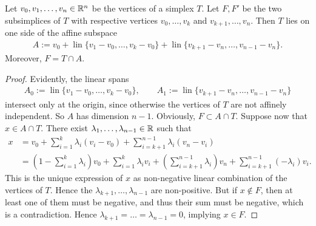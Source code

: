 \documentclass[10pt,a4paper]{article}
\begin{document}
\begin{lemma}\label{lemma:oppositesubsimplex}
    Let $v_0, v_1, \dots, v_n \in {\mathbb R}^n$ be the vertices of a simplex $T$.
    Let $F, F'$ be the two subsimplices of $T$ with respective vertices $v_0,\dots,v_k$ and $v_{k+1},\dots,v_n$.
    Then $T$ lies on one side of the affine subspace
    \begin{gather*}
        A 
        := 
        v_0 
        + 
        \operatorname{lin}\{ v_1 - v_0, \dots, v_k - v_0 \} 
        +  
        \operatorname{lin}\{ v_{k+1} - v_n, \dots, v_{n-1} - v_n \}.
    \end{gather*}
    Moreover, $F = T \cap A$.
\end{lemma}
\begin{proof}
    Evidently, the linear spans 
    \begin{gather*}
        A_{0} := \operatorname{lin}\{ v_1 - v_0, \dots, v_k - v_0 \},
        \qquad 
        A_{1} := \operatorname{lin}\{ v_{k+1} - v_n, \dots, v_{n-1} - v_n \}
    \end{gather*}
    intersect only at the origin, since otherwise the vertices of $T$ are not affinely independent. 
    So $A$ has dimension $n-1$. 
    Obviously, $F \subset A \cap T$. 
    Suppose now that $x \in A \cap T$.
    There exist $\lambda_1,\dots,\lambda_{n-1} \in {\mathbb R}$ such that 
    \begin{align*}
        x &= 
        v_0 + \sum_{i=1}^{k} \lambda_{i} ( v_i - v_0 ) + \sum_{i=k+1}^{n-1} \lambda_{i} ( v_n - v_i )
        \\&
        = 
        \left( 1 - \sum_{i=1}^{k} \lambda_{i} \right) v_0 
        + 
        \sum_{i=1  }^{k  } \lambda_{i} v_i 
        + 
        \left( \sum_{i=k+1}^{n-1} \lambda_{i} \right) v_n
        + 
        \sum_{i=k+1}^{n-1} (-\lambda_{i}) v_i 
        .
    \end{align*}
    This is the unique expression of $x$ as non-negative linear combination of the vertices of $T$.
    Hence the $\lambda_{k+1}, \dots, \lambda_{n-1}$ are non-positive.
    But if $x \notin F$, then at least one of them must be negative,
    and thus their sum must be negative, which is a contradiction. 
    Hence $\lambda_{k+1} = \dots = \lambda_{n-1} = 0$, implying $x \in F$.
\end{proof}
\end{document}
